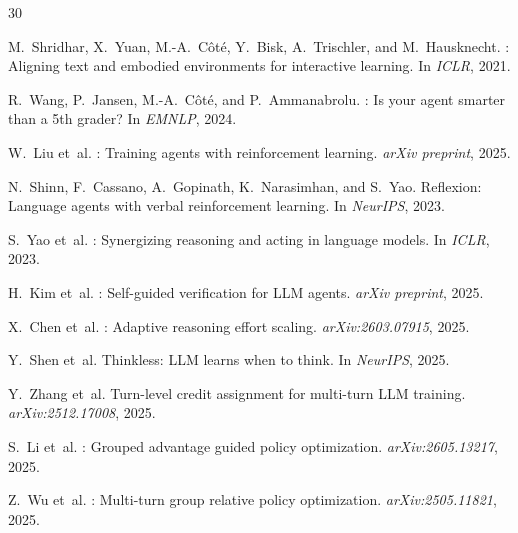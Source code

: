 \documentclass[10pt]{article}
\begin{document}
{\small

\begin{thebibliography}{30}

M.~Shridhar, X.~Yuan, M.-A.~C\^{o}t\'{e}, Y.~Bisk, A.~Trischler, and M.~Hausknecht.
: Aligning text and embodied environments for interactive learning.
\newblock In \emph{ICLR}, 2021.

R.~Wang, P.~Jansen, M.-A.~C\^{o}t\'{e}, and P.~Ammanabrolu.
: Is your agent smarter than a 5th grader?
\newblock In \emph{EMNLP}, 2024.

W.~Liu et~al.
: Training agents with reinforcement learning.
\newblock \emph{arXiv preprint}, 2025.

N.~Shinn, F.~Cassano, A.~Gopinath, K.~Narasimhan, and S.~Yao.
\newblock Reflexion: Language agents with verbal reinforcement learning.
\newblock In \emph{NeurIPS}, 2023.

S.~Yao et~al.
: Synergizing reasoning and acting in language models.
\newblock In \emph{ICLR}, 2023.

H.~Kim et~al.
: Self-guided verification for LLM agents.
\newblock \emph{arXiv preprint}, 2025.

X.~Chen et~al.
: Adaptive reasoning effort scaling.
\newblock \emph{arXiv:2603.07915}, 2025.

Y.~Shen et~al.
\newblock Thinkless: LLM learns when to think.
\newblock In \emph{NeurIPS}, 2025.

Y.~Zhang et~al.
\newblock Turn-level credit assignment for multi-turn LLM training.
\newblock \emph{arXiv:2512.17008}, 2025.

S.~Li et~al.
: Grouped advantage guided policy optimization.
\newblock \emph{arXiv:2605.13217}, 2025.

Z.~Wu et~al.
: Multi-turn group relative policy optimization.
\newblock \emph{arXiv:2505.11821}, 2025.


\end{thebibliography}}
\end{document}

